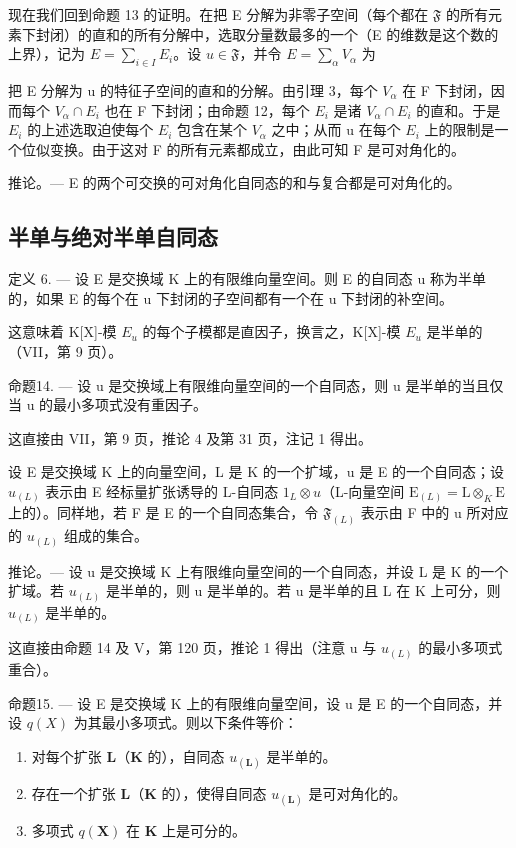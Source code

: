 现在我们回到命题 13 的证明。在把 E 分解为非零子空间（每个都在 \(\mathfrak{F}\) 的所有元素下封闭）的直和的所有分解中，选取分量数最多的一个（E 的维数是这个数的上界），记为 \(E = \sum_{i\in I}E_i\)。设 \(u\in \mathfrak{F}\)，并令 \(E = \sum_{\alpha}V_{\alpha}\) 为

把 E 分解为 u 的特征子空间的直和的分解。由引理 3，每个 \(V_{\alpha}\) 在 F 下封闭，因而每个 \(V_{\alpha} \cap E_{i}\) 也在 F 下封闭；由命题 12，每个 \(E_{i}\) 是诸 \(V_{\alpha} \cap E_{i}\) 的直和。于是 \(E_{i}\) 的上述选取迫使每个 \(E_{i}\) 包含在某个 \(V_{\alpha}\) 之中；从而 u 在每个 \(E_{i}\) 上的限制是一个位似变换。由于这对 F 的所有元素都成立，由此可知 F 是可对角化的。

推论。--- E 的两个可交换的可对角化自同态的和与复合都是可对角化的。

\subsection{半单与绝对半单自同态}

定义 6. --- 设 E 是交换域 K 上的有限维向量空间。则 E 的自同态 u 称为半单的，如果 E 的每个在 u 下封闭的子空间都有一个在 u 下封闭的补空间。

这意味着 K{[}X{]}-模 \(E_{u}\) 的每个子模都是直因子，换言之，K{[}X{]}-模 \(E_{u}\) 是半单的（VII，第 9 页）。

命题14. --- 设 u 是交换域上有限维向量空间的一个自同态，则 u 是半单的当且仅当 u 的最小多项式没有重因子。

这直接由 VII，第 9 页，推论 4 及第 31 页，注记 1 得出。

设 E 是交换域 K 上的向量空间，L 是 K 的一个扩域，u 是 E 的一个自同态；设 \(u_{(L)}\) 表示由 E 经标量扩张诱导的 L-自同态 \(1_{L} \otimes u\)（L-向量空间 \(\mathrm{E}_{(L)} = \mathrm{L} \otimes_{K} \mathrm{E}\) 上的）。同样地，若 F 是 E 的一个自同态集合，令 \(\mathfrak{F}_{(L)}\) 表示由 F 中的 u 所对应的 \(u_{(L)}\) 组成的集合。

推论。--- 设 u 是交换域 K 上有限维向量空间的一个自同态，并设 L 是 K 的一个扩域。若 \(u_{(L)}\) 是半单的，则 u 是半单的。若 u 是半单的且 L 在 K 上可分，则 \(u_{(L)}\) 是半单的。

这直接由命题 14 及 V，第 120 页，推论 1 得出（注意 u 与 \(u_{(L)}\) 的最小多项式重合）。

命题15. --- 设 E 是交换域 K 上的有限维向量空间，设 u 是 E 的一个自同态，并设 \(q(X)\) 为其最小多项式。则以下条件等价：

\begin{enumerate}
\def\labelenumi{(\roman{enumi})}
\item
  对每个扩张 \(\mathbf{L}\)（\(\mathbf{K}\) 的），自同态 \(u_{(\mathbf{L})}\) 是半单的。
\item
  存在一个扩张 \(\mathbf{L}\)（\(\mathbf{K}\) 的），使得自同态 \(u_{(\mathbf{L})}\) 是可对角化的。
\item
  多项式 \(q(\mathbf{X})\) 在 \(\mathbf{K}\) 上是可分的。
\end{enumerate}

